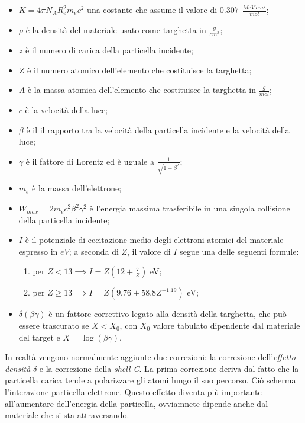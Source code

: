 \documentclass[12pt, letterpaper]{book}
\begin{document}
\begin{itemize}
    \item $K=4\pi N_A R_e^2 m_ec^2$ una costante che assume il valore di $0.307~~\frac{MeV ~ cm^2}{mol}$;
    \item $\rho$ è la densità del materiale usato come targhetta in $\frac{g}{cm^3}$;
    \item $z$ è il numero di carica della particella incidente;
    \item $Z$ è il numero atomico dell'elemento che costituisce la targhetta;
    \item $A$ è la massa atomica dell'elemento che costituisce la targhetta in $\frac{g}{mol}$;
    \item $c$ è la velocità della luce;
    \item $\beta$  è il il rapporto tra la velocità della particella incidente e la velocità della luce;
    \item $\gamma$ è il fattore di Lorentz ed è uguale a $\frac{1}{\sqrt{1-\beta^2}}$;
    \item $m_e$ è la massa dell'elettrone;
    \item $W_{max}=2m_ec^2\beta^2\gamma^2$ è l’energia massima trasferibile in una singola collisione della particella incidente;
    \item $I$ è il potenziale di eccitazione medio degli elettroni atomici del materiale espresso in $eV$; a seconda di $Z$, il valore di $I$ segue una delle seguenti formule:
    \begin{enumerate}
        \item per $Z<13 \implies I=Z(12+\frac{7}{Z})$ eV;
        \item per $Z\geq 13 \implies I=Z(9.76+58.8Z^{-1.19})$ eV;
    \end{enumerate}
    \item $\delta(\beta\gamma)$ è un fattore correttivo legato alla densità della targhetta, che può essere trascurato se $X < X_0$, con $X_0$ valore tabulato dipendente dal materiale del target e $X=\log(\beta \gamma)$.
\end{itemize}
In realtà vengono normalmente aggiunte due correzioni: la correzione dell'\textit{effetto densità} $\delta$ e la correzione della \textit{shell C}. La prima correzione deriva dal fatto che la particella carica tende a polarizzare gli atomi lungo il suo percorso. Ciò scherma l'interazione particella-elettrone. Questo effetto diventa più importante all'aumentare dell'energia della particella, ovviamnete dipende anche dal materiale che si sta attraversando.\\
\end{document}
